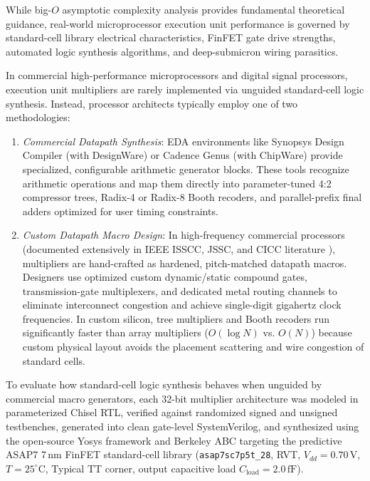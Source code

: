 While big-$O$ asymptotic complexity analysis provides fundamental theoretical guidance, real-world microprocessor execution unit performance is governed by standard-cell library electrical characteristics, FinFET gate drive strengths, automated logic synthesis algorithms, and deep-submicron wiring parasitics. 

In commercial high-performance microprocessors and digital signal processors, execution unit multipliers are rarely implemented via unguided standard-cell logic synthesis. Instead, processor architects typically employ one of two methodologies:
\begin{enumerate}
    \item \textit{Commercial Datapath Synthesis}: EDA environments like Synopsys Design Compiler (with DesignWare) or Cadence Genus (with ChipWare) provide specialized, configurable arithmetic generator blocks. These tools recognize arithmetic operations and map them directly into parameter-tuned 4:2 compressor trees, Radix-4 or Radix-8 Booth recoders, and parallel-prefix final adders optimized for user timing constraints.
    
    \item \textit{Custom Datapath Macro Design}: In high-frequency commercial processors (documented extensively in IEEE ISSCC, JSSC, and CICC literature \cite{santoro1989, goto1992, ohkubo1995, goto1997, hagihara1998}), multipliers are hand-crafted as hardened, pitch-matched datapath macros. Designers use optimized custom dynamic/static compound gates, transmission-gate multiplexers, and dedicated metal routing channels to eliminate interconnect congestion and achieve single-digit gigahertz clock frequencies. In custom silicon, tree multipliers and Booth recoders run significantly faster than array multipliers ($O(\log N)$ vs. $O(N)$) because custom physical layout avoids the placement scattering and wire congestion of standard cells.
\end{enumerate}

To evaluate how standard-cell logic synthesis behaves when unguided by commercial macro generators, each 32-bit multiplier architecture was modeled in parameterized Chisel RTL, verified against randomized signed and unsigned testbenches, generated into clean gate-level SystemVerilog, and synthesized using the open-source Yosys framework and Berkeley ABC targeting the predictive ASAP7 7\,nm FinFET standard-cell library (\texttt{asap7sc7p5t\_28}, RVT, $V_{dd} = 0.70\,\text{V}$, $T = 25^\circ\text{C}$, Typical TT corner, output capacitive load $C_{\text{load}} = 2.0\,\text{fF}$).

